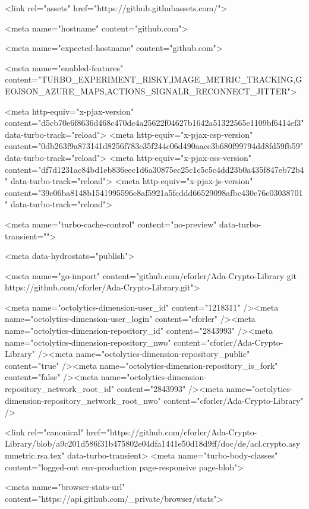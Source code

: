     <link rel="assets" href="https://github.githubassets.com/">


        <meta name="hostname" content="github.com">



        <meta name="expected-hostname" content="github.com">

    <meta name="enabled-features" content="TURBO_EXPERIMENT_RISKY,IMAGE_METRIC_TRACKING,GEOJSON_AZURE_MAPS,ACTIONS_SIGNALR_RECONNECT_JITTER">


  <meta http-equiv="x-pjax-version" content="d5cb70e6f8636d468c470dc4a25622f04627b1642a51322565e1109bf6414ef3" data-turbo-track="reload">
  <meta http-equiv="x-pjax-csp-version" content="0db263f9a873141d8256f783c35f244c06d490aacc3b680f99794dd8fd59fb59" data-turbo-track="reload">
  <meta http-equiv="x-pjax-css-version" content="df7d1231ac84bd1eb836eec1d6a30875ec25c1c5c5c4dd23b0a435f847eb72b4" data-turbo-track="reload">
  <meta http-equiv="x-pjax-js-version" content="39c06ba8148b1541995596e8af5921a5fcddd66529098afbc430e76e03038701" data-turbo-track="reload">

  <meta name="turbo-cache-control" content="no-preview" data-turbo-transient="">

        <meta data-hydrostats="publish">

  <meta name="go-import" content="github.com/cforler/Ada-Crypto-Library git https://github.com/cforler/Ada-Crypto-Library.git">

  <meta name="octolytics-dimension-user_id" content="1218311" /><meta name="octolytics-dimension-user_login" content="cforler" /><meta name="octolytics-dimension-repository_id" content="2843993" /><meta name="octolytics-dimension-repository_nwo" content="cforler/Ada-Crypto-Library" /><meta name="octolytics-dimension-repository_public" content="true" /><meta name="octolytics-dimension-repository_is_fork" content="false" /><meta name="octolytics-dimension-repository_network_root_id" content="2843993" /><meta name="octolytics-dimension-repository_network_root_nwo" content="cforler/Ada-Crypto-Library" />



    <link rel="canonical" href="https://github.com/cforler/Ada-Crypto-Library/blob/a9c201d586f31b475802e04dfa1441e50d18d9ff/doc/de/acl.crypto.asymmetric.rsa.tex" data-turbo-transient>
  <meta name="turbo-body-classes" content="logged-out env-production page-responsive page-blob">


  <meta name="browser-stats-url" content="https://api.github.com/_private/browser/stats">

